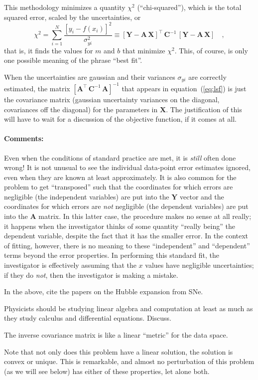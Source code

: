 \documentclass[12pt]{article}
\newcommand{\equationname}{equation}
\newcommand{\commentsname}{Comments}
\newcounter{problem}
\newenvironment{comments}{\paragraph{\commentsname:}}{}
\newcommand{\mmatrix}[1]{\boldsymbol{#1}}
\newcommand{\inverse}[1]{{#1}^{-1}}
\newcommand{\transpose}[1]{{#1}^{\scriptscriptstyle \top}}
\newcommand{\mA}{\mmatrix{A}}
\newcommand{\mAT}{\transpose{\mA}}
\newcommand{\mC}{\mmatrix{C}}
\newcommand{\mCinv}{\inverse{\mC}}
\newcommand{\mX}{\mmatrix{X}}
\newcommand{\mY}{\mmatrix{Y}}
\begin{document}
This methodology minimizes a quantity $\chi^2$ (``chi-squared''),
which is the total squared error, scaled by the uncertainties, or
\begin{equation}\label{eq:chisquared}
\chi^2
 = \sum_{i=1}^N \frac{\left[y_i - f(x_i)\right]^2}{\sigma_{yi}^2}
 \equiv \transpose{\left[\mY-\mA\,\mX\right]}
 \,\mCinv\,\left[\mY-\mA\,\mX\right]
 \quad ,
\end{equation}
that is, it finds the values for $m$ and $b$ that minimize $\chi^2$.
This, of course, is only one possible meaning of the phrase ``best
fit''.

When the uncertainties are gaussian and their variances $\sigma_{yi}$
are correctly estimated, the matrix
$\inverse{\left[\mAT\,\mCinv\,\mA\right]}$ that appears in
\equationname~(\ref{eq:lsf}) is just the covariance matrix (gaussian
uncertainty variances on the diagonal, covariances off the diagonal)
for the parameters in $\mX$.  The justification of this will have to
wait for a discussion of the objective function, if it comes at all.

\begin{comments}
Even when the conditions of standard practice are met, it is
\emph{still} often done wrong!  It is not unusual to see the
individual data-point error estimates ignored, even when they are
known at least approximately.  It is also common for the problem to
get ``transposed'' such that the coordinates for which errors are
negligible (the independent variables) are put into the $\mY$ vector
and the coordinates for which errors are \emph{not} negligible (the
dependent variables) are put into the $\mA$ matrix.  In this latter
case, the procedure makes no sense at all really; it happens when the
investigator thinks of some quantity ``really being'' the dependent
variable, despite the fact that it has the smaller error.  In the
context of fitting, however, there is no meaning to these
``independent'' and ``dependent'' terms beyond the error properties.
In performing this standard fit, the investigator is effectively
assuming that the $x$ values have negligible uncertainties; if they do
\emph{not}, then the investigator is making a mistake.

In the above, cite the papers on the Hubble expansion from SNe.

Physicists should be studying linear algebra and computation at least
as much as they study calculus and differential equations.  Discuss.

The inverse covariance matrix is like a linear ``metric'' for the data
space.

Note that not only does this problem have a linear solution, the
solution is convex or unique.  This is remarkable, and almost no
perturbation of this problem (as we will see below) has either of
these properties, let alone both.
\end{comments}
\end{document}
